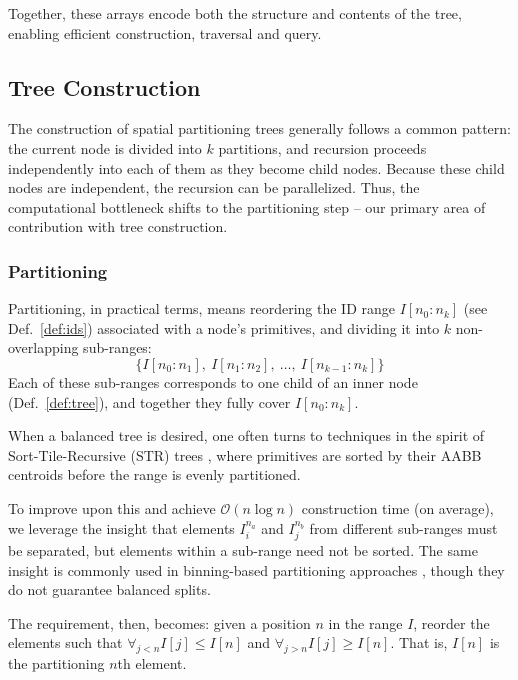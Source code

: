 Together, these arrays encode both the structure and contents
of the tree, enabling efficient construction, traversal and query.




\subsection{Tree Construction}

The construction of spatial partitioning trees generally
follows a common pattern: the current node is divided into
$k$ partitions, and recursion proceeds independently into
each of them as they become child nodes. Because these
child nodes are independent, the recursion can be
parallelized. Thus, the computational bottleneck shifts to
the partitioning step -- our primary area of contribution
with tree construction.

\subsubsection{Partitioning}

Partitioning, in practical terms, means reordering the ID
range $I[n_0:n_k]$ (see Def.~\ref{def:ids}) associated with a
node’s primitives, and dividing it into $k$ non-overlapping
sub-ranges:
\[
	\{I[n_0:n_1],\ I[n_1:n_2],\ \dots,\ I[n_{k-1}:n_k]\}
\]
Each of these sub-ranges corresponds to one child of an
inner node (Def.~\ref{def:tree}), and together they fully
cover $I[n_0:n_k]$.

When a balanced tree is desired, one often turns to
techniques in the spirit of Sort-Tile-Recursive (STR) trees
\cite{str-tree}, where primitives are sorted by their AABB
centroids before the range is evenly partitioned.

To improve upon this and achieve $\mathcal{O}(n\log n)$
construction time (on average), we leverage the insight
that elements $I_i^{n_a}$ and $I_j^{n_b}$ from different
sub-ranges must be separated, but elements within a
sub-range need not be sorted. The same insight is commonly
used in binning-based partitioning approaches \cite{bvh-survey},
though they do not guarantee balanced splits.

The requirement, then, becomes: given a position $n$ in
the range $I$, reorder the elements such that
$\forall_{j<n}I[j] \le I[n]$ and $\forall_{j>n}I[j] \ge I[n]$.
That is, $I[n]$ is the partitioning $n$th element.

